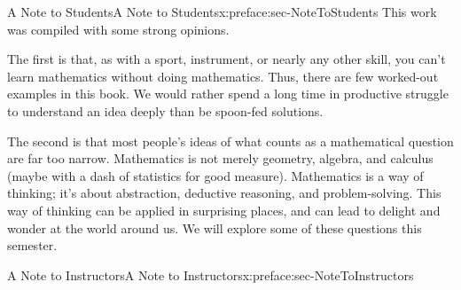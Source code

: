 \documentclass[oneside,10pt,]{book}
\numberwithin{equation}{section}
\begin{document}
%
%
\typeout{************************************************}
\typeout{************************************************}
%
\begin{preface}{A Note to Students}{}{A Note to Students}{}{}{x:preface:sec-NoteToStudents}
This work was compiled with some strong opinions.%
\par
The first is that, as with a sport, instrument, or nearly any other skill, you can't learn mathematics without doing mathematics. Thus, there are few worked-out examples in this book. We would rather spend a long time in productive struggle to understand an idea deeply than be spoon-fed solutions.%
\par
The second is that most people's ideas of what counts as a mathematical question are far too narrow. Mathematics is not merely geometry, algebra, and calculus (maybe with a dash of statistics for good measure). Mathematics is a way of thinking; it's about abstraction, deductive reasoning, and problem-solving. This way of thinking can be applied in surprising places, and can lead to delight and wonder at the world around us. We will explore some of these questions this semester.%
\end{preface}
%
%
\typeout{************************************************}
\typeout{************************************************}
%
\begin{preface}{A Note to Instructors}{}{A Note to Instructors}{}{}{x:preface:sec-NoteToInstructors}
%
\end{preface}
\setcounter{tocdepth}{0}
\renewcommand*\contentsname{Contents}
\tableofcontents
\mainmatter
%
%
\typeout{************************************************}
\typeout{************************************************}
%
\end{document}
